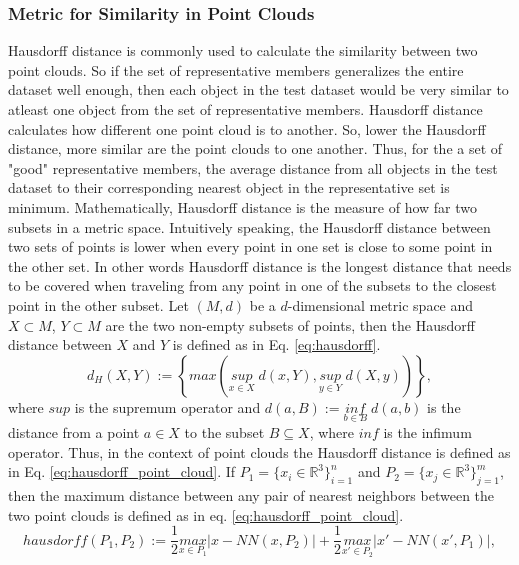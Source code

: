 \subsubsection{Metric for Similarity in Point Clouds}
Hausdorff distance is commonly used to calculate the similarity between two point clouds. So if the set of representative members generalizes the entire dataset well enough, then each object in the test dataset would be very similar to atleast one object from the set of representative members. Hausdorff distance calculates how different one point cloud is to another. So, lower the Hausdorff distance, more similar are the point clouds to one another. Thus, for the a set of "good" representative members, the average distance from all objects in the test dataset to their corresponding nearest object in the representative set is minimum. Mathematically, Hausdorff distance is the measure of how far two subsets in a metric space. Intuitively speaking, the Hausdorff distance between two sets of points is lower when every point in one set is close to some point in the other set. In other words Hausdorff distance is the longest distance that needs to be covered when traveling from any point in one of the subsets to the closest point in the other subset. Let $(M,d)$ be a $d$-dimensional metric space and $X \subset M$, $Y \subset M$ are the two non-empty subsets of points, then the Hausdorff distance between $X$ and $Y$ is defined as in Eq. \ref{eq:hausdorff}.
\begin{equation}
    \label{eq:hausdorff}
    \mathit{d_H(X,Y)} := \mathit{\left\{max(\underset{x \in X}{sup} \; d(x,Y), \underset{y \in Y}{sup} \; d(X,y))\right\}},
  \end{equation}
where $sup$ is the supremum operator and $d(a,B) := \underset{b \in B}{inf} \; d(a,b)$ is the distance from a point $a \in X$ to the subset $B \subseteq X$, where $inf$ is the infimum operator. Thus, in the context of point clouds the Hausdorff distance is defined as in Eq. \ref{eq:hausdorff_point_cloud}. If $P_1 = \{x_i \in \mathbb{R}^3\}_{i=1}^n$ and $P_2 = \{x_j \in \mathbb{R}^3\}_{j=1}^m$, then the maximum distance between any pair of nearest neighbors between the two point clouds is defined as in eq. \ref{eq:hausdorff_point_cloud}.
\begin{equation}
    \label{eq:hausdorff_point_cloud}
    \mathit{hausdorff(P_1, P_2)} := \mathit{\frac{1}{2} \underset{x \in P_1}{max}\lvert x - NN(x,P_2) \rvert + \frac{1}{2} \underset{x' \in P_2}{max}\lvert x' - NN(x',P_1) \rvert},
  \end{equation}
